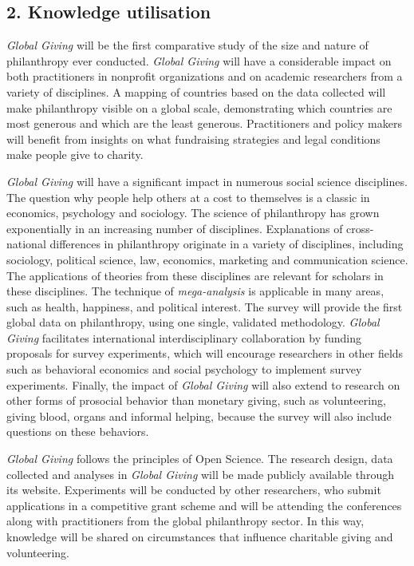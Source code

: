 \documentclass[twocolumn, serif, rga, numeric]{jote-article}
\begin{document}
 {}\subsection*{2. Knowledge utilisation} 

\emph{Global Giving} will be the first comparative study of the size and nature of philanthropy ever conducted. \emph{Global Giving} will have a considerable impact on both practitioners in nonprofit organizations and on academic researchers from a variety of disciplines. A mapping of countries based on the data collected will make philanthropy visible on a global scale, demonstrating which countries are most generous and which are the least generous. Practitioners and policy makers will benefit from insights on what fundraising strategies and legal conditions make people give to charity.

\emph{Global Giving} will have a significant impact in numerous social science disciplines. The question why people help others at a cost to themselves is a classic in economics, psychology and sociology.\cite{147, -148} The science of philanthropy has grown exponentially\cite{149, -150} in an increasing number of disciplines.\cite{151} Explanations of cross-national differences in philanthropy originate in a variety of disciplines, including sociology, political science, law, economics, marketing and communication science. The applications of theories from these disciplines are relevant for scholars in these disciplines. The technique of \emph{mega-analysis}\cite{Wilhelm2006} is applicable in many areas, such as health, happiness, and political interest. The survey will provide the first global data on philanthropy, using one single, validated methodology. \emph{Global Giving}
facilitates international interdisciplinary collaboration by funding proposals for survey experiments, which will encourage researchers in other fields such as behavioral economics and social psychology to implement survey experiments. Finally, the impact of \emph{Global Giving} will also extend to research on other forms of prosocial behavior than monetary giving, such as volunteering, giving blood, organs and informal helping, because the survey will also include questions on these behaviors.

\emph{Global Giving} follows the principles of Open Science. The research design, data collected and analyses in \emph{Global Giving}
will be made publicly available through its website. Experiments will be conducted by other researchers, who submit applications in a competitive grant scheme and will be attending the conferences along with practitioners from the global philanthropy sector. In this way, knowledge will be shared on circumstances that influence charitable giving and volunteering.
\end{document}
